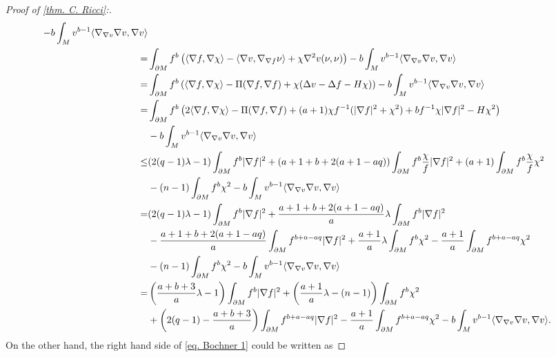 \documentclass[12pt]{amsart}%
\numberwithin{equation}{section}
\numberwithin{lemma}{section}
\numberwithin{proposition}{section}
\numberwithin{corollary}{section}
\numberwithin{remark}{section}
\begin{document}
\begin{proof}[Proof of \cref{thm. C. Ricci}:]
\begin{align}
        -b\int_Mv^{b-1}\langle\nabla_{\nabla v}\nabla v,\nabla v\rangle\notag\\
        =&\int_{\partial M}f^b\left(
        \langle\nabla f,\nabla \chi\rangle-\langle\nabla v,\nabla_{\nabla f}\nu\rangle+\chi\nabla^2v(\nu,\nu)
        \right)
        -b\int_Mv^{b-1}\langle\nabla_{\nabla v}\nabla v,\nabla v\rangle\notag\\
        =&\int_{\partial M}f^b\left(
        \langle\nabla f,\nabla \chi\rangle
        -\Pi(\nabla f,\nabla f)
        +\chi(\Delta v-\Delta f-H\chi)
        \right)
        -b\int_Mv^{b-1}\langle\nabla_{\nabla v}\nabla v,\nabla v\rangle\notag\\
        =&\int_{\partial M}f^b
        \left(
        2\langle\nabla f,\nabla \chi\rangle
        -\Pi(\nabla f,\nabla f)
        +(a+1)\chi f^{-1}(|\nabla f|^2+\chi^2)
        +bf^{-1}\chi|\nabla f|^2
        -H\chi^2
        \right)\notag\\
        &-b\int_Mv^{b-1}\langle\nabla_{\nabla v}\nabla v,\nabla v\rangle\notag\\
        \leq&(2(q-1)\lambda-1)\int_{\partial M}f^b|\nabla f|^2
        +\left(a+1+b+2(a+1-aq)\right)\int_{\partial M}f^b\frac{\chi}{f}|\nabla f|^2
        +(a+1)\int_{\partial M}f^b\frac{\chi}{f}\chi^2\notag\\
        &-(n-1)\int_{\partial M}f^b\chi^2
        -b\int_M v^{b-1}\langle\nabla_{\nabla v}\nabla v,\nabla v\rangle\notag\\
        =&(2(q-1)\lambda-1)\int_{\partial M}f^b|\nabla f|^2
        +\frac{a+1+b+2(a+1-aq)}{a}\lambda\int_{\partial M}f^b|\nabla f|^2\notag\\
        &-\frac{a+1+b+2(a+1-aq)}{a}\int_{\partial M}f^{b+a-aq}|\nabla f|^2
        +\frac{a+1}{a}\lambda\int_{\partial M}f^b\chi^2
        -\frac{a+1}{a}\int_{\partial M}f^{b+a-aq}\chi^2\notag\\
        &-(n-1)\int_{\partial M}f^b\chi^2
        -b\int_M v^{b-1}\langle\nabla_{\nabla v}\nabla v,\nabla v\rangle\notag\\
        =&\left(\frac{a+b+3}{a}\lambda-1\right)
        \int_{\partial M}f^b|\nabla f|^2
        +\left(\frac{a+1}{a}\lambda-(n-1)\right)
        \int_{\partial M}f^b\chi^2\notag\\
        &+\left(2(q-1)-\frac{a+b+3}{a}\right)
        \int_{\partial M}f^{b+a-aq}|\nabla f|^2
        -\frac{a+1}{a}\int_{\partial M}f^{b+a-aq}\chi^2
        -b\int_M v^{b-1}\langle\nabla_{\nabla v}\nabla v,\nabla v\rangle.
    \end{align}
    On the other hand, the right hand side of \cref{eq. Bochner 1} could be written as

\end{proof}
\end{document}
